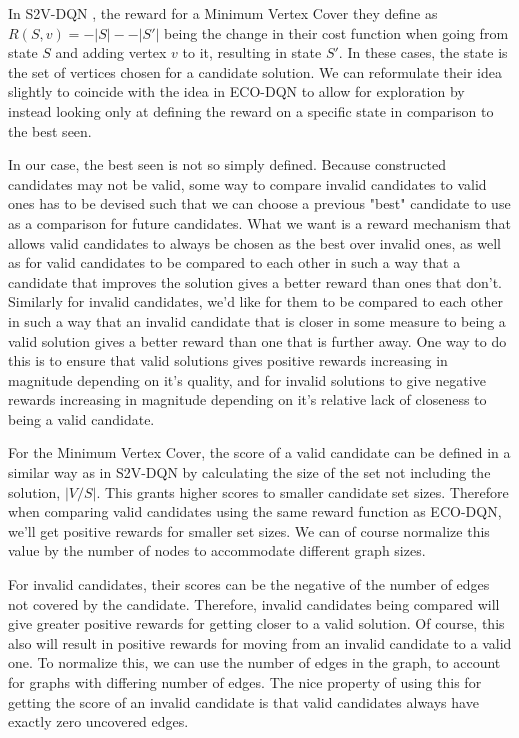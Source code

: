 \documentclass{article}
\begin{document}
In S2V-DQN \cite{s2v-dqn}, the reward for a Minimum Vertex Cover they define as $R(S, v) = -|S| - -|S'|$ being the change in their cost function when going from state $S$ and adding vertex $v$ to it, resulting in state $S'$. In these cases, the state is the set of vertices chosen for a candidate solution. We can reformulate their idea slightly to coincide with the idea in ECO-DQN to allow for exploration by instead looking only at defining the reward on a specific state in comparison to the best seen. 

In our case, the best seen is not so simply defined. Because constructed candidates may not be valid, some way to compare invalid candidates to valid ones has to be devised such that we can choose a previous "best" candidate to use as a comparison for future candidates. What we want is a reward mechanism that allows valid candidates to always be chosen as the best over invalid ones, as well as for valid candidates to be compared to each other in such a way that a candidate that improves the solution gives a better reward than ones that don't. Similarly for invalid candidates, we'd like for them to be compared to each other in such a way that an invalid candidate that is closer in some measure to being a valid solution gives a better reward than one that is further away. One way to do this is to ensure that valid solutions gives positive rewards increasing in magnitude depending on it's quality, and for invalid solutions to give negative rewards increasing in magnitude depending on it's relative lack of closeness to being a valid candidate.

For the Minimum Vertex Cover, the score of a valid candidate can be defined in a similar way as in S2V-DQN by calculating the size of the set not including the solution, $|V / S|$. This grants higher scores to smaller candidate set sizes. Therefore when comparing valid candidates using the same reward function as ECO-DQN, we'll get positive rewards for smaller set sizes. We can of course normalize this value by the number of nodes to accommodate different graph sizes.

For invalid candidates, their scores can be the negative of the number of edges not covered by the candidate. Therefore, invalid candidates being compared will give greater positive rewards for getting closer to a valid solution. Of course, this also will result in positive rewards for moving from an invalid candidate to a valid one. To normalize this, we can use the number of edges in the graph, to account for graphs with differing number of edges. The nice property of using this for getting the score of an invalid candidate is that valid candidates always have exactly zero uncovered edges.
\end{document}
